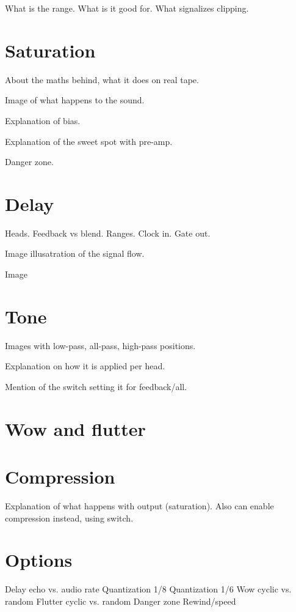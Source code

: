 \documentclass[11pt]{article}
\begin{document}
What is the range. What is it good for. What signalizes clipping.

\section{Saturation}

About the maths behind, what it does on real tape.

Image of what happens to the sound.

Explanation of bias.

Explanation of the sweet spot with pre-amp.

Danger zone.

\section{Delay}

Heads. Feedback vs blend. Ranges. Clock in. Gate out.

Image illusatration of the signal flow.

Image 

\section{Tone}

Images with low-pass, all-pass, high-pass positions.

Explanation on how it is applied per head.

Mention of the switch setting it for feedback/all.

\section{Wow and flutter}

\section{Compression}

Explanation of what happens with output (saturation). Also can enable compression instead, using switch.

\section{Options}

Delay echo vs. audio rate
Quantization 1/8
Quantization 1/6
Wow cyclic vs. random
Flutter cyclic vs. random
Danger zone
Rewind/speed
\end{document}
